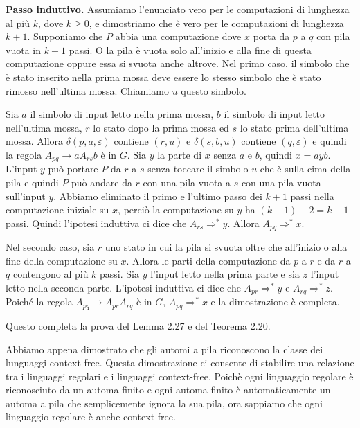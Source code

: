 \documentclass{article}
\begin{document}
\textbf{Passo induttivo.}
Assumiamo l'enunciato vero per le computazioni di lunghezza al più $k$, dove $k \geq 0$, e dimostriamo che è vero per le computazioni di lunghezza $k + 1$.
Supponiamo che $P$ abbia una computazione dove $x$ porta da $p$ a $q$ con pila vuota in $k + 1$ passi. 
O la pila è vuota solo all'inizio e alla fine di questa computazione oppure essa si svuota anche altrove.
Nel primo caso, il simbolo che è stato inserito nella prima mossa deve essere lo stesso simbolo che è stato rimosso nell'ultima mossa. 
Chiamiamo $u$ questo simbolo. 

Sia $a$ il simbolo di input letto nella prima mossa, $b$ il
simbolo di input letto nell'ultima mossa, $r$ lo stato dopo la prima mossa
ed $s$ lo stato prima dell'ultima mossa. Allora $\delta(p,a,\varepsilon)$ contiene $(r, u)$ e
$\delta(s,b,u)$ contiene $(q,\varepsilon)$ e quindi la regola $A_{pq} \rightarrow aA_{rs}b$ è in $G$.
Sia $y$ la parte di $x$ senza $a$ e $b$, quindi $x = ayb$. 
L'input $y$ può portare $P$ da $r$ a $s$ senza toccare il simbolo $u$ che è sulla cima della pila e quindi $P$ può
andare da $r$ con una pila vuota a $s$ con una pila vuota sull'input $y$. 
Abbiamo eliminato il primo e l'ultimo passo dei $k +1$ passi nella computazione iniziale
su $x$, perciò la computazione su $y$ ha $(k + 1) - 2 = k - 1$ passi.
Quindi l'ipotesi induttiva ci dice che $A_{rs} \Rightarrow^{*} y$. 
Allora $A_{pq} \Rightarrow^{*} x$.

Nel secondo caso, sia $r$ uno stato in cui la pila si svuota oltre che all'inizio o alla fine della computazione su $x$. 
Allora le parti della computazione da $p$ a $r$ e da $r$ a $q$ contengono al più $k$ passi. 
Sia $y$ l'input letto nella prima parte e sia $z$ l'input letto nella seconda parte. 
L'ipotesi induttiva ci dice che $A_{pr} \Rightarrow^{*} y$ e $A_{rq} \Rightarrow^{*} z$. 
Poiché la regola $A_{pq} \rightarrow A_{pr}A_{rq}$ è in $G$, $A_{pq} \Rightarrow^{*} x$ e
la dimostrazione è completa.

Questo completa la prova del Lemma 2.27 e del Teorema 2.20.
\vspace{1em}

Abbiamo appena dimostrato che gli automi a pila riconoscono la classe dei lunguaggi context-free.
Questa dimostrazione ci consente di stabilire una relazione tra i linguaggi regolari e i linguaggi context-free.
Poichè ogni linguaggio regolare è riconosciuto da un automa finito e ogni automa finito è automaticamente un automa a pila che semplicemente ignora la sua pila, ora sappiamo che ogni linguaggio regolare è anche context-free. 
\end{document}
